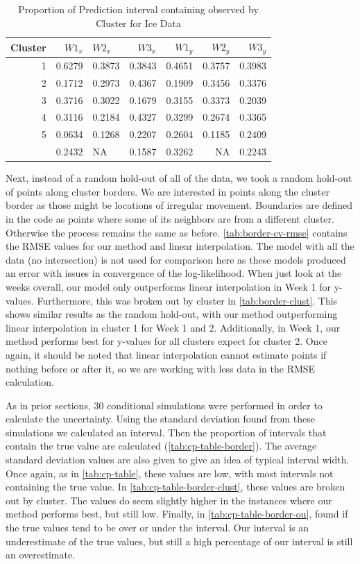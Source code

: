 \documentclass[12pt]{article}
\begin{document}
\begin{table}

\caption{\label{tab:cp-clust-actual}Proportion of Prediction interval containing observed by Cluster for Ice Data}
\centering
\begin{tabular}[t]{rrlrrrr}
\toprule
Cluster & $W1_{x}$ & $W2_{x}$ & $W3_{x}$ & $W1_{y}$ & $W2_{y}$ & $W3_{y}$\\
\midrule
1 & 0.6279 & 0.3873 & 0.3843 & 0.4651 & 0.3757 & 0.3983\\
2 & 0.1712 & 0.2973 & 0.4367 & 0.1909 & 0.3456 & 0.3376\\
3 & 0.3716 & 0.3022 & 0.1679 & 0.3155 & 0.3373 & 0.2039\\
4 & 0.3116 & 0.2184 & 0.4327 & 0.3299 & 0.2674 & 0.3365\\
5 & 0.0634 & 0.1268 & 0.2207 & 0.2604 & 0.1185 & 0.2409\\
\addlinespace
6 & 0.2432 & NA & 0.1587 & 0.3262 & NA & 0.2243\\
\bottomrule
\end{tabular}
\end{table}

Next, instead of a random hold-out of all of the data, we took a random
hold-out of points along cluster borders. We are interested in points
along the cluster border as those might be locations of irregular
movement. Boundaries are defined in the code as points where some of its
neighbors are from a different cluster. Otherwise the process remains
the same as before. \cref{tab:border-cv-rmse} contains the RMSE values
for our method and linear interpolation. The model with all the data (no
intersection) is not used for comparison here as these models produced
an error with issues in convergence of the log-likelihood. When just
look at the weeks overall, our model only outperforms linear
interpolation in Week 1 for y-values. Furthermore, this was broken out
by cluster in \cref{tab:border-clust}. This shows similar results as the
random hold-out, with our method outperforming linear interpolation in
cluster 1 for Week 1 and 2. Additionally, in Week 1, our method performs
best for y-values for all clusters expect for cluster 2. Once again, it
should be noted that linear interpolation cannot estimate points if
nothing before or after it, so we are working with less data in the RMSE
calculation.

As in prior sections, 30 conditional simulations were performed in order
to calculate the uncertainty. Using the standard deviation found from
these simulations we calculated an interval. Then the proportion of
intervals that contain the true value are calculated
(\cref{tab:cp-table-border}). The average standard deviation values are
also given to give an idea of typical interval width. Once again, as in
\cref{tab:cp-table}, these values are low, with most intervals not
containing the true value. In \cref{tab:cp-table-border-clust}, these
values are broken out by cluster. The values do seem slightly higher in
the instances where our method performs best, but still low. Finally, in
\cref{tab:cp-table-border-ou}, found if the true values tend to be over
or under the interval. Our interval is an underestimate of the true
values, but still a high percentage of our interval is still an
overestimate.
\end{document}
